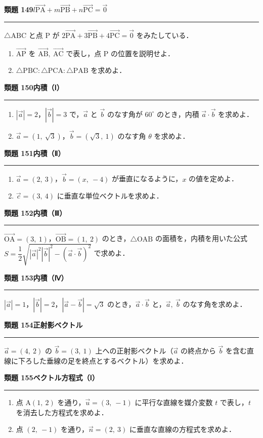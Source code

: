 \documentclass[a4paper,11pt]{ltjsarticle}
\newcommand{\mon}[2]{\Needspace{7\baselineskip}\vspace{10pt}%
  {\sffamily\bfseries 類題 #1\quad #2\par}\vspace{2pt}\hrule\vspace{4pt}}
\begin{document}
\mon{149}{$l\overrightarrow{\mathrm{PA}}+m\overrightarrow{\mathrm{PB}}+n\overrightarrow{\mathrm{PC}}=\vec0$}
$\triangle\mathrm{ABC}$ と点 P が $2\overrightarrow{\mathrm{PA}}+3\overrightarrow{\mathrm{PB}}+4\overrightarrow{\mathrm{PC}}=\vec0$ をみたしている．
\begin{enumerate}
\item $\overrightarrow{\mathrm{AP}}$ を $\overrightarrow{\mathrm{AB}},\ \overrightarrow{\mathrm{AC}}$ で表し，点 P の位置を説明せよ．
\item $\triangle\mathrm{PBC}:\triangle\mathrm{PCA}:\triangle\mathrm{PAB}$ を求めよ．
\end{enumerate}

\mon{150}{内積（Ⅰ）}
\begin{enumerate}
\item $|\vec a|=2$，$|\vec b|=3$ で，$\vec a$ と $\vec b$ のなす角が $60^\circ$ のとき，内積 $\vec a\cdot\vec b$ を求めよ．
\item $\vec a=(1,\ \sqrt3)$，$\vec b=(\sqrt3,\ 1)$ のなす角 $\theta$ を求めよ．
\end{enumerate}

\mon{151}{内積（Ⅱ）}
\begin{enumerate}
\item $\vec a=(2,\ 3)$，$\vec b=(x,\ -4)$ が垂直になるように，$x$ の値を定めよ．
\item $\vec c=(3,\ 4)$ に垂直な単位ベクトルを求めよ．
\end{enumerate}

\mon{152}{内積（Ⅲ）}
$\overrightarrow{\mathrm{OA}}=(3,\ 1)$，$\overrightarrow{\mathrm{OB}}=(1,\ 2)$ のとき，$\triangle\mathrm{OAB}$ の面積を，内積を用いた公式 $S=\dfrac12\sqrt{|\vec a|^2|\vec b|^2-(\vec a\cdot\vec b)^2}$ で求めよ．

\mon{153}{内積（Ⅳ）}
$|\vec a|=1$，$|\vec b|=2$，$|\vec a-\vec b|=\sqrt3$ のとき，$\vec a\cdot\vec b$ と，$\vec a,\ \vec b$ のなす角を求めよ．

\mon{154}{正射影ベクトル}
$\vec a=(4,\ 2)$ の $\vec b=(3,\ 1)$ 上への正射影ベクトル（$\vec a$ の終点から $\vec b$ を含む直線に下ろした垂線の足を終点とするベクトル）を求めよ．

\mon{155}{ベクトル方程式（Ⅰ）}
\begin{enumerate}
\item 点 $\mathrm A(1,\ 2)$ を通り，$\vec u=(3,\ -1)$ に平行な直線を媒介変数 $t$ で表し，$t$ を消去した方程式を求めよ．
\item 点 $(2,\ -1)$ を通り，$\vec n=(2,\ 3)$ に垂直な直線の方程式を求めよ．
\end{enumerate}
\end{document}

